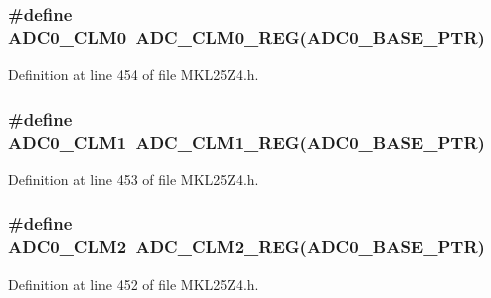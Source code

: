 \subsubsection[{\texorpdfstring{A\+D\+C0\+\_\+\+C\+L\+M0}{ADC0_CLM0}}]{\setlength{\rightskip}{0pt plus 5cm}\#define A\+D\+C0\+\_\+\+C\+L\+M0~{\bf A\+D\+C\+\_\+\+C\+L\+M0\+\_\+\+R\+EG}({\bf A\+D\+C0\+\_\+\+B\+A\+S\+E\+\_\+\+P\+TR})}\hypertarget{group___a_d_c___register___accessor___macros_ga5dca3dc10fac37b7fc668a9664da1607}{}\label{group___a_d_c___register___accessor___macros_ga5dca3dc10fac37b7fc668a9664da1607}


Definition at line 454 of file M\+K\+L25\+Z4.\+h.

\subsubsection[{\texorpdfstring{A\+D\+C0\+\_\+\+C\+L\+M1}{ADC0_CLM1}}]{\setlength{\rightskip}{0pt plus 5cm}\#define A\+D\+C0\+\_\+\+C\+L\+M1~{\bf A\+D\+C\+\_\+\+C\+L\+M1\+\_\+\+R\+EG}({\bf A\+D\+C0\+\_\+\+B\+A\+S\+E\+\_\+\+P\+TR})}\hypertarget{group___a_d_c___register___accessor___macros_ga18d9c7c3d402716526d6f90bcbe1811a}{}\label{group___a_d_c___register___accessor___macros_ga18d9c7c3d402716526d6f90bcbe1811a}


Definition at line 453 of file M\+K\+L25\+Z4.\+h.

\subsubsection[{\texorpdfstring{A\+D\+C0\+\_\+\+C\+L\+M2}{ADC0_CLM2}}]{\setlength{\rightskip}{0pt plus 5cm}\#define A\+D\+C0\+\_\+\+C\+L\+M2~{\bf A\+D\+C\+\_\+\+C\+L\+M2\+\_\+\+R\+EG}({\bf A\+D\+C0\+\_\+\+B\+A\+S\+E\+\_\+\+P\+TR})}\hypertarget{group___a_d_c___register___accessor___macros_ga5e13c2498b80a3492922e32d88d35079}{}\label{group___a_d_c___register___accessor___macros_ga5e13c2498b80a3492922e32d88d35079}


Definition at line 452 of file M\+K\+L25\+Z4.\+h.

